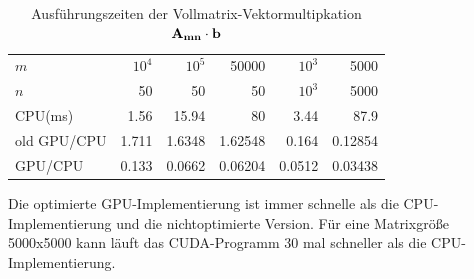 \begin{table}
\renewcommand{\arraystretch}{1.3}
\caption{Ausführungszeiten der Vollmatrix-Vektormultipkation $ \bf{A_{mn} } \cdot \bf b$}
\label{tab_shared_memory}
\centering
\begin{tabular}{|l||r|r|r|r|r|}

\hline
	$m$& $10^4$ & $10^5$ & 50000& $10^3 $ & 5000\\
    $n$& 50& 50& 50& $10^3$ & 5000 \\

\hline
\hline
CPU(ms)& 1.56&    15.94& 				80&      3.44& 87.9\\

old GPU/CPU& 1.711& 1.6348&   1.62548&  0.164&  0.12854\\

GPU/CPU & 0.133& 0.0662&     0.06204&   0.0512& 0.03438\\


\hline
\end{tabular}
\end{table}
Die optimierte GPU-Implementierung ist immer schnelle als die CPU-Implementierung  und die nichtoptimierte Version. Für eine Matrixgröße 5000x5000 kann läuft das CUDA-Programm 30 mal schneller als die CPU-Implementierung.

